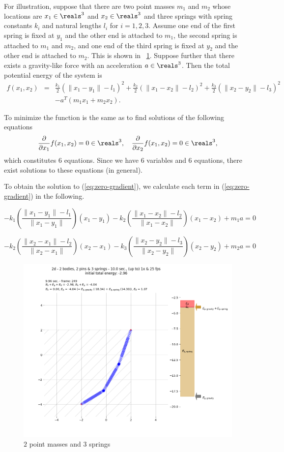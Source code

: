 \documentclass{article}
\begin{document}
For illustration,
suppose that there are two point masses
$m_1$ and $m_2$ whose locations are $x_1\in\reals^3$ and $x_2\in\reals^3$
and three springs with spring constants $k_i$ and natural lengths $l_i$ for $i=1,2,3$.
Assume one end of the first spring is fixed at $y_1$ and the other end is attached to $m_1$,
the second spring is attached to $m_1$ and $m_2$,
and one end of the third spring is fixed at $y_2$ and the other end is attached to $m_2$.
This is shown in \figurename~\ref{fig:two-masses-and-three-springs}.
Suppose further that there exists a gravity-like force with an acceleration $a\in\reals^3$.
Then the total potential energy of the system is
\begin{eqnarray}
\nonumber
f(x_1,x_2)&=&
\frac{k_1}{2} (\|x_1-y_1\|-l_1)^2
+\frac{k_2}{2} (\|x_1-x_2\|-l_2)^2
+\frac{k_3}{2} (\|x_2-y_2\|-l_3)^2
\\
\label{eq:sum-of-potential-energies}
&&
-a^T(m_1x_1+m_2x_2).
\end{eqnarray}

To minimize the function
is the same as to find solutions of
the following equations
\begin{equation}
\label{eq:zero-gradient}
\frac{\partial}{\partial x_1} f(x_1,x_2) = 0 \in\reals^3,
\quad
\frac{\partial}{\partial x_2} f(x_1,x_2) = 0 \in\reals^3,
\end{equation}
which constitutes $6$ equations.
Since we have $6$ variables and $6$ equations,
there exist solutions to these equations (in general).

To obtain the solution to (\ref{eq:zero-gradient}),
we calculate each term in (\ref{eq:zero-gradient}) in the following.

\begin{equation}
\label{eq:force:1}
-k_1\left(\frac{\|x_1-y_1\| -l_1}{\|x_1-y_1\|}\right) (x_1-y_1)
-k_2\left(\frac{\|x_1-x_2\| -l_2}{\|x_1-x_2\|}\right) (x_1-x_2)
+ m_1 a
= 0
\end{equation}

\begin{equation}
\label{eq:force:2}
-k_2\left(\frac{\|x_2-x_1\| -l_2}{\|x_2-x_1\|}\right) (x_2-x_1)
-k_3\left(\frac{\|x_2-y_2\| -l_3}{\|x_2-y_2\|}\right) (x_2-y_2)
+ m_2 a
= 0
\end{equation}

\begin{figure}
\begin{center}
\includegraphics[trim=180 100 350 220, clip, width=.35\textwidth]{figures/2d-2-bodies-2-pins}
\end{center}
\caption{$2$ point masses and $3$ springs}
\label{fig:two-masses-and-three-springs}
\end{figure}
\end{document}
